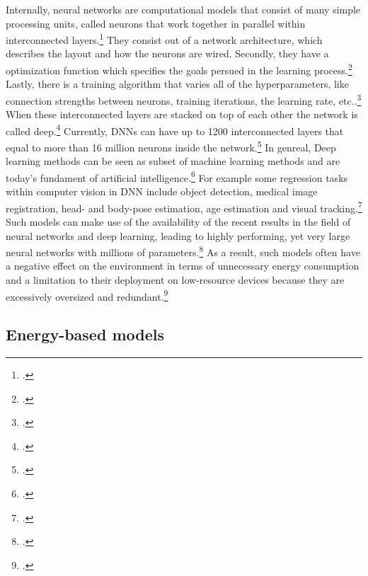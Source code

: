 Internally, neural networks are computational models that consist of many simple processing units, called neurons that work together in parallel within interconnected layers.\footcite[Vgl.][305]{cichyDeepNeuralNetworks2019}
They consist out of a network architecture, which describes the layout and how the neurons are wired. Secondly, they have a optimization function which specifies the goals persued in the learning process.\footcite[Vgl.][1583]{durstewitzDeepNeuralNetworks2019}
Lastly, there is a training algorithm that varies all of the hyperparameters, like connection strengths between neurons, training iterations, the learning rate, etc..\footcite[Vgl.][1583]{durstewitzDeepNeuralNetworks2019}
When these interconnected layers are stacked on top of each other the network is called deep.\footcite[Vgl.][305]{cichyDeepNeuralNetworks2019}
Currently, \ac{DNN}s can have up to 1200 interconnected layers that equal to more than 16 million neurons inside the network.\footcite[Vgl.][2]{mallComprehensiveReviewDeep2023}
In genreal, Deep learning methods can be seen as subset of machine learning methods and are today's fundament of artificial intelligence.\footcite[Vgl.][1583]{durstewitzDeepNeuralNetworks2019}
For example some regression tasks within computer vision in \ac{DNN} include object detection, medical image registration, head- and body-pose estimation, age estimation and visual tracking.\footcite[Vgl.][325-326]{gustafssonEnergyBasedModelsDeep2020}
Such models can make use of the availability of the recent results in the field of neural networks and deep learning, leading to highly performing, yet very large neural networks with millions of parameters.\footcite[Vgl.][152]{marinoDeepNeuralNetworks2023}
As a result, such models often have a negative effect on the environment in terms of unnecessary energy consumption and a limitation to their deployment on low-resource devices because they are excessively oversized and redundant.\footcite[Vgl.][152]{marinoDeepNeuralNetworks2023}


\subsection{Energy-based models}

